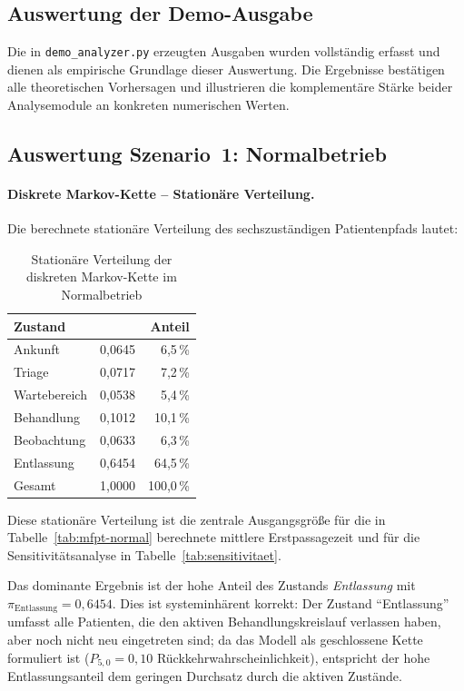 ﻿\documentclass[a4paper,12pt]{report}
\theoremstyle{definition}
\begin{document}
\subsection{Auswertung der Demo-Ausgabe}
\label{sec:demo-auswertung}

Die in \texttt{demo\_analyzer.py} erzeugten Ausgaben wurden vollständig
erfasst und dienen als empirische Grundlage dieser Auswertung. Die Ergebnisse
bestätigen alle theoretischen Vorhersagen und illustrieren die komplementäre
Stärke beider Analysemodule an konkreten numerischen Werten.

\subsection{Auswertung Szenario~1: Normalbetrieb}

\paragraph{Diskrete Markov-Kette -- Stationäre Verteilung.}
Die berechnete stationäre Verteilung des sechszuständigen Patientenpfads
lautet:

\begin{table}[H]
	\centering
	\begin{tabular}{@{}lrr@{}}
		\toprule
		\textbf{Zustand} & \boldmath{$\pi_i$} & \textbf{Anteil} \\
		\midrule
		Ankunft     & 0{,}0645 &  6{,}5\,\% \\
		Triage      & 0{,}0717 &  7{,}2\,\% \\
		Wartebereich& 0{,}0538 &  5{,}4\,\% \\
		Behandlung  & 0{,}1012 & 10{,}1\,\% \\
		Beobachtung & 0{,}0633 &  6{,}3\,\% \\
		Entlassung  & 0{,}6454 & 64{,}5\,\% \\
		\midrule
		Gesamt      & 1{,}0000 & 100{,}0\,\% \\
		\bottomrule
	\end{tabular}
	\caption{Stationäre Verteilung der diskreten Markov-Kette im Normalbetrieb}
\label{tab:stationaer-normal}
	\label{tab:pi-normal}
\end{table}

Diese stationäre Verteilung ist die zentrale Ausgangsgröße für die in Tabelle~\ref{tab:mfpt-normal} berechnete mittlere Erstpassagezeit und für die Sensitivitätsanalyse in Tabelle~\ref{tab:sensitivitaet}.

Das dominante Ergebnis ist der hohe Anteil des Zustands \emph{Entlassung}
mit $\pi_\text{Entlassung} = 0{,}6454$. Dies ist systeminhärent korrekt:
Der Zustand ``Entlassung'' umfasst alle Patienten, die den aktiven
Behandlungskreislauf verlassen haben, aber noch nicht neu eingetreten sind;
da das Modell als geschlossene Kette formuliert ist ($P_{5,0} = 0{,}10$
Rückkehrwahrscheinlichkeit), entspricht der hohe Entlassungsanteil
dem geringen Durchsatz durch die aktiven Zustände.
\end{document}
